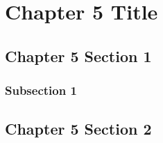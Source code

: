 \chapter{Chapter 5 Title}
\section{Chapter 5 Section 1}
\subsection{Subsection 1}
\section{Chapter 5 Section 2}
